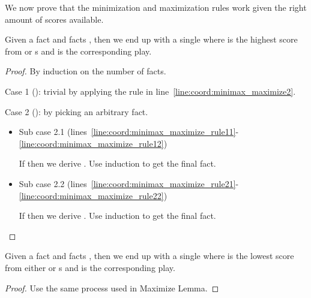 We now prove that the minimization and maximization rules work given the right
amount of scores available.

\begin{lemma}
Given a fact  and  facts
, then we end up with a single
 where  is the
highest score from  or s and
 is the corresponding play.
\end{lemma}
\begin{proof}
By induction on the number of  facts.

Case 1 (): trivial by applying the rule in
line~\ref{line:coord:minimax_maximize2}.

Case 2 (): by picking an arbitrary  fact.

\begin{itemize}
   \item Sub case 2.1
      (lines~\ref{line:coord:minimax_maximize_rule11}-\ref{line:coord:minimax_maximize_rule12})

      If  then we derive . Use induction to get the final  fact.

   \item Sub case 2.2
      (lines~\ref{line:coord:minimax_maximize_rule21}-\ref{line:coord:minimax_maximize_rule22})

      If  then we derive . Use induction to get the final  fact.

\end{itemize}

\end{proof}

\begin{lemma}
Given a fact  and  facts
, then we end up with a single
 where  is the
lowest score from either  or s and
 is the corresponding play.
\end{lemma}
\begin{proof}
Use the same process used in Maximize Lemma.
\end{proof}


